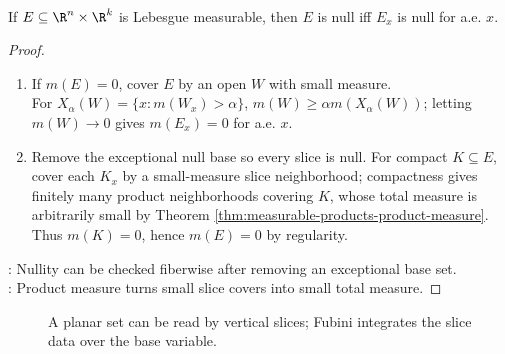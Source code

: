 \begin{theorem} \label{thm:zero-slices-null-set-criterion} \\
If $E\subseteq\R^n\times\R^k$ is Lebesgue measurable, then $E$ is null iff $E_x$ is null for a.e. $x$.
\begin{proof}
\begin{enumerate}[label=\roman*.]
\setlength{\itemsep}{0pt}
\item[$(\Rightarrow)$] If $m(E)=0$, cover $E$ by an open $W$ with small measure.\\
For $X_\alpha(W)=\{x:m(W_x)>\alpha\}$, $m(W)\geq \alpha m(X_\alpha(W))$; letting $m(W)\to0$ gives $m(E_x)=0$ for a.e. $x$.
\item[$(\Leftarrow)$] Remove the exceptional null base so every slice is null. For compact $K\subseteq E$, cover each $K_x$ by a small-measure slice neighborhood; compactness gives finitely many product neighborhoods covering $K$, whose total measure is arbitrarily small by Theorem \ref{thm:measurable-products-product-measure}. Thus $m(K)=0$, hence $m(E)=0$ by regularity.
\end{enumerate}
: Nullity can be checked fiberwise after removing an exceptional base set.\\
: Product measure turns small slice covers into small total measure.
\end{proof}
\end{theorem}

\begin{figure}[H]
  \centering
  
  \caption{A planar set can be read by vertical slices; Fubini integrates the slice data over the base variable.}
  \label{fig:cavalieri-slicing-planar-set}
\end{figure}


